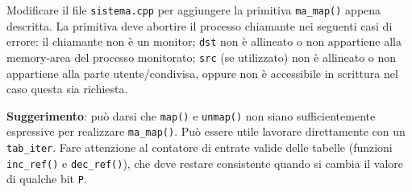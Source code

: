 Modificare il file \verb|sistema.cpp| per aggiungere la primitiva \verb|ma_map()| appena descritta.
La primitiva deve abortire il processo chiamante nei seguenti casi di errore: il chiamante non \`e
un monitor; \verb|dst| non \`e allineato o non appartiene alla memory-area del processo monitorato;
\verb|src| (se utilizzato) non \`e allineato o non appartiene alla parte utente/condivisa, oppure
non \`e accessibile in scrittura nel caso questa sia richiesta.

{\bf Suggerimento}: pu\`o darsi che \verb|map()| e \verb|unmap()| non siano sufficientemente
espressive per realizzare \verb|ma_map()|. Pu\`o essere utile lavorare direttamente con un \verb|tab_iter|.
Fare attenzione al contatore di entrate valide delle tabelle (funzioni \verb|inc_ref()| e \verb|dec_ref()|),
che deve restare consistente quando si cambia il valore di qualche bit \verb|P|.
